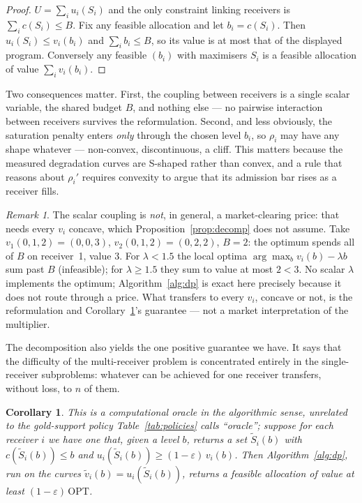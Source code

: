 \documentclass[sigconf,anonymous]{aamas}
\newtheorem{corollary}[proposition]{Corollary}
\theoremstyle{remark}
\newtheorem{remark}{Remark}
\begin{document}
\begin{proof}
$U = \sum_i u_i(S_i)$ and the only constraint linking receivers is
$\sum_i c(S_i) \le B$. Fix any feasible allocation and let
$b_i = c(S_i)$. Then $u_i(S_i) \le v_i(b_i)$ and $\sum_i b_i \le B$, so
its value is at most that of the displayed program. Conversely any
feasible $(b_i)$ with maximisers $S_i$ is a feasible allocation of
value $\sum_i v_i(b_i)$.
\end{proof}

Two consequences matter. First, the coupling between receivers is a
single scalar variable, the shared budget $B$, and nothing else --- no
pairwise interaction between receivers survives the reformulation.
Second, and less obviously, the saturation penalty enters \emph{only}
through the chosen level $b_i$, so $\rho_i$ may have any shape
whatever --- non-convex, discontinuous, a cliff. This matters because
the measured degradation curves are S-shaped rather than convex, and a
rule that reasons about $\rho_i'$ requires convexity to argue that its
admission bar rises as a receiver fills.

\begin{remark}
\label{rem:noprice}
The scalar coupling is \emph{not}, in general, a market-clearing
price: that needs every $v_i$ concave, which Proposition~\ref{prop:decomp}
does not assume. Take $v_1(0,1,2)=(0,0,3)$, $v_2(0,1,2)=(0,2,2)$,
$B=2$: the optimum spends all of $B$ on receiver~1, value $3$. For
$\lambda<1.5$ the local optima $\arg\max_b v_i(b)-\lambda b$ sum past
$B$ (infeasible); for $\lambda\ge1.5$ they sum to value at most
$2<3$. No scalar $\lambda$ implements the optimum;
Algorithm~\ref{alg:dp} is exact here precisely because it does not
route through a price. What transfers to every $v_i$, concave or not,
is the reformulation and Corollary~\ref{prop:approx}'s guarantee ---
not a market interpretation of the multiplier.
\end{remark}

The decomposition also yields the one positive guarantee we have. It
says that the difficulty of the multi-receiver problem is concentrated
entirely in the single-receiver subproblems: whatever can be achieved
for one receiver transfers, without loss, to $n$ of them.

\begin{corollary}
\label{prop:approx}
This is a computational oracle in the algorithmic sense, unrelated to
the gold-support policy Table~\ref{tab:policies} calls ``oracle'';
suppose for each receiver $i$ we have one that, given a level
$b$, returns a set $\widetilde{S}_i(b)$ with
$c(\widetilde{S}_i(b)) \le b$ and
$u_i(\widetilde{S}_i(b)) \ge (1-\varepsilon)\,v_i(b)$. Then
Algorithm~\ref{alg:dp}, run on the curves
$\widetilde{v}_i(b) = u_i(\widetilde{S}_i(b))$, returns a feasible
allocation of value at least $(1-\varepsilon)\,\mathrm{OPT}$.
\end{corollary}
\end{document}
